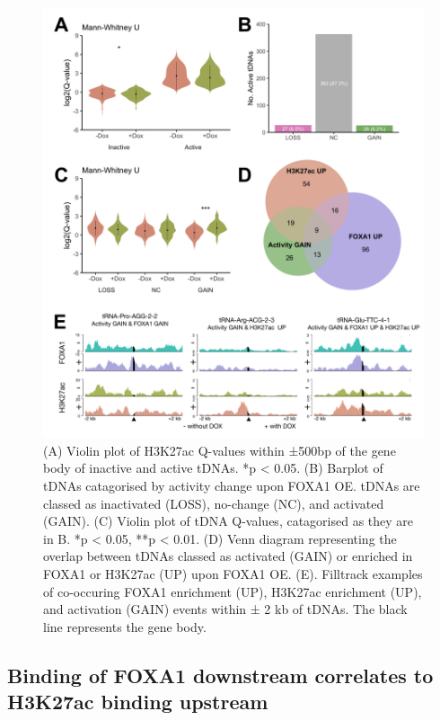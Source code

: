 \documentclass[
  12pt,
]{article}
\begin{document}
\begin{figure}[p]
\includegraphics[width=1\linewidth]{../images/results-03} \caption{(A) Violin plot of H3K27ac Q-values within ±500bp of the gene body of inactive and active tDNAs. *p < 0.05. (B) Barplot of tDNAs catagorised by activity change upon FOXA1 OE. tDNAs are classed as inactivated (LOSS), no-change (NC), and activated (GAIN). (C) Violin plot of tDNA Q-values, catagorised as they are in B. *p < 0.05, **p < 0.01. (D) Venn diagram representing the overlap between tDNAs classed as activated (GAIN) or enriched in FOXA1 or H3K27ac (UP) upon FOXA1 OE. (E). Filltrack examples of co-occuring FOXA1 enrichment (UP), H3K27ac enrichment (UP), and activation (GAIN) events within ± 2 kb of tDNAs. The black line represents the gene body.}\label{fig:results-3}
\end{figure}

\hypertarget{binding-of-foxa1-downstream-correlates-to-h3k27ac-binding-upstream}{%
\subsection{Binding of FOXA1 downstream correlates to H3K27ac binding upstream}\label{binding-of-foxa1-downstream-correlates-to-h3k27ac-binding-upstream}}
\end{document}
